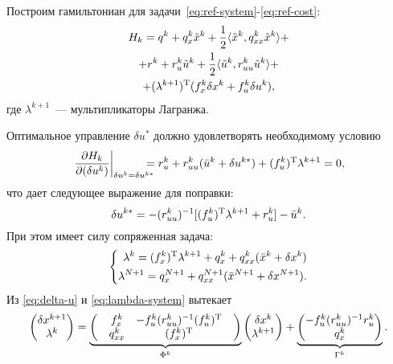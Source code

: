 \documentclass[../../doc.tex]{subfiles}
\begin{document}
    Построим гамильтониан для задачи~\eqref{eq:ref-system}-\eqref{eq:ref-cost}:
    \begin{multline}\label{eq:hamiltonian}
        H_k = q^{k} + q_x^{k}\tilde x^{k} + \frac{1}{2}\langle \tilde x^{k}, q_{xx}^{k}\tilde x^{k} \rangle
        +\\+
        r^{k} + r_u^{k}\tilde u^{k} + \frac{1}{2}\langle \tilde u^{k}, r_{uu}^{k}\tilde u^{k} \rangle
        +\\+
        (\lambda^{k+1})^\textnormal{T} (f_x^k \delta x^k + f_u^k \delta u^k),
    \end{multline}
    где $\lambda^{k+1}$~--- мультипликаторы Лагранжа.

    Оптимальное управление $\delta u^{*}$ должно удовлетворять необходимому условию
    \begin{equation*}
        \left.\frac{\partial H_k}{\partial (\delta u^k)}\right|_{\delta u^k = \delta u^{k*}}
        \!\!\!\!\!\!=
        r_u^k + r_{uu}^k(\bar u^k + \delta u^{k*}) + (f_u^k)^\textnormal{T}\lambda^{k+1} = 0,
    \end{equation*}
    что дает следующее выражение для поправки:
    \begin{equation}\label{eq:delta-u}
        \delta u^{k*} = - (r_{uu}^k)^{-1}[(f_u^k)^\textnormal{T}\lambda^{k+1} + r_u^k] - \bar u^k.
    \end{equation}
    При этом имеет силу сопряженная задача:
    \begin{equation}\label{eq:lambda-system}
        \left\{\begin{aligned}
            \lambda^k = (f_x^k)^\textnormal{T} \lambda^{k+1} + q_x^k + q_{xx}^k(\bar x^k + \delta x^k)
            \\
            \lambda^{N+1} = q_x^{N+1} + q_{xx}^{N+1}(\bar x^{N+1} + \delta x^{N+1})
            .
        \end{aligned}\right.
    \end{equation}
    Из \eqref{eq:delta-u} и \eqref{eq:lambda-system} вытекает
    \begin{equation}\label{eq:delta-x-lambda-system}
        \begin{pmatrix}
            \delta x^{k+1}
            \\
            \lambda^{k}
        \end{pmatrix}
        =
        \underbrace{\begin{pmatrix}
            & f_x^k & -f^k_u (r^k_{uu})^{-1} (f^k_u)^\textnormal{T} &
            \\
            & q^k_{xx} & (f^k_x)^\textnormal{T} &
        \end{pmatrix}}_{\Phi^k}
        \begin{pmatrix}
            \delta x^k
            \\
            \lambda^{k+1}
        \end{pmatrix}
        +
        \underbrace{\begin{pmatrix}
            -f^k_u (r^k_{uu})^{-1} r^k_u
            \\
            q^k_x
        \end{pmatrix}}_{\Gamma^k}.
    \end{equation}
\end{document}
